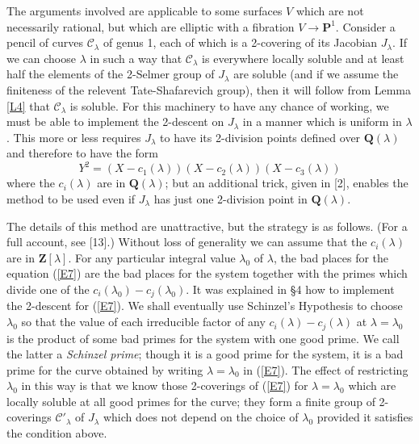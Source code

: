 \documentclass[12pt]{article}
\def\bP{{\mathbf P}}
\def\bQ{{\mathbf Q}}
\def\bZ{{\mathbf Z}}
\def\gl{{\lambda}}
\def\sC{{\mathcal C}}
\def\beq{\begin{equation} \label}
\begin{document}
The arguments involved are applicable to some surfaces $V$ which are not
necessarily rational, but which are elliptic with a fibration
$V\rightarrow\bP^1$. Consider a pencil of curves $\sC_\gl$ of genus 1, each of
which is a 2-covering of its Jacobian $J_\gl$. If we can choose $\gl$ in
such a way that $\sC_\gl$ is everywhere locally soluble and at least half
the elements of the 2-Selmer group of $J_\gl$
are soluble (and if we assume the finiteness of the relevent Tate-Shafarevich
group), then it will follow from Lemma \ref{L4} that $\sC_\gl$ is soluble.
For this machinery to have any chance of working, we must be able to implement
the 2-descent on $J_\gl$ in a manner which is uniform in $\gl$. This more or
less requires $J_\gl$ to have its 2-division points defined over $\bQ(\gl)$ and
therefore to have the form
\beq{E7} Y^2=(X-c_1(\gl))(X-c_2(\gl))(X-c_3(\gl)) \end{equation}
where the $c_i(\gl)$ are in $\bQ(\gl)$; but an additional trick, given in [2],
enables the method to be used even if
$J_\gl$ has just one 2-division point in $\bQ(\gl)$.

The details of this method are unattractive, but the strategy is as follows.
(For a full account, see [13].)
Without loss of generality we can assume that the $c_i(\gl)$ are in $\bZ[\gl]$.
For any particular integral value  $\gl_0$ of
$\gl$, the bad places for the equation (\ref{E7})
are the bad places for the system together with the primes which divide one
of the $c_i(\gl_0)-c_j(\gl_0)$. It was explained in \S4 how to implement the
2-descent for (\ref{E7}). We shall eventually use Schinzel's Hypothesis
to choose $\gl_0$ so that the value of each irreducible factor of any
$c_i(\gl)-c_j(\gl)$ at $\gl=\gl_0$ is the product of some bad primes for the
system with one good prime. We call the latter a \emph{Schinzel prime}; though
it is a good prime for the system, it is
a bad prime for the curve obtained by writing $\gl=\gl_0$ in (\ref{E7}). The
effect of restricting $\gl_0$ in this way
is that we know those 2-coverings of (\ref{E7}) for $\gl=\gl_0$
which are locally soluble at all good primes for the curve; they form a finite
group of 2-coverings $\sC'_\gl$ of $J_\gl$ which does not depend on the choice
of $\gl_0$ provided it satisfies the condition above.
\end{document}

